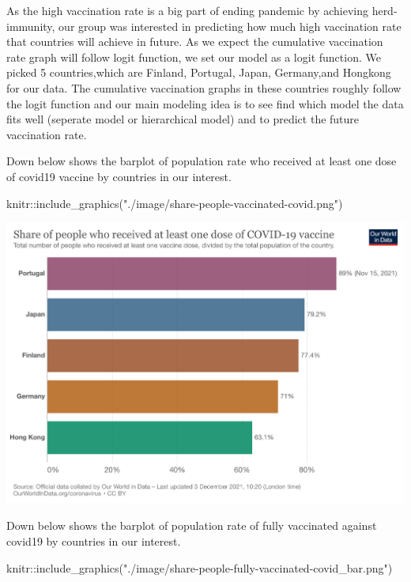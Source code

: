 \documentclass[
]{article}
\newenvironment{Shaded}{\begin{snugshade}}{\end{snugshade}}
\newcommand{\FunctionTok}[1]{\textcolor[rgb]{0.00,0.00,0.00}{#1}}
\newcommand{\NormalTok}[1]{#1}
\newcommand{\SpecialCharTok}[1]{\textcolor[rgb]{0.00,0.00,0.00}{#1}}
\newcommand{\StringTok}[1]{\textcolor[rgb]{0.31,0.60,0.02}{#1}}
\begin{document}
As the high vaccination rate is a big part of ending pandemic by
achieving herd-immunity, our group was interested in predicting how much
high vaccination rate that countries will achieve in future. As we
expect the cumulative vaccination rate graph will follow logit function,
we set our model as a logit function. We picked 5 countries,which are
Finland, Portugal, Japan, Germany,and Hongkong for our data. The
cumulative vaccination graphs in these countries roughly follow the
logit function and our main modeling idea is to see find which model the
data fits well (seperate model or hierarchical model) and to predict the
future vaccination rate.

Down below shows the barplot of population rate who received at least
one dose of covid19 vaccine by countries in our interest.

\begin{Shaded}
\begin{Highlighting}[]
\NormalTok{knitr}\SpecialCharTok{::}\FunctionTok{include\_graphics}\NormalTok{(}\StringTok{"./image/share{-}people{-}vaccinated{-}covid.png"}\NormalTok{)}
\end{Highlighting}
\end{Shaded}

\includegraphics{./image/share-people-vaccinated-covid.png}

Down below shows the barplot of population rate of fully vaccinated
against covid19 by countries in our interest.

\begin{Shaded}
\begin{Highlighting}[]
\NormalTok{knitr}\SpecialCharTok{::}\FunctionTok{include\_graphics}\NormalTok{(}\StringTok{"./image/share{-}people{-}fully{-}vaccinated{-}covid\_bar.png"}\NormalTok{)}
\end{Highlighting}
\end{Shaded}
\end{document}
